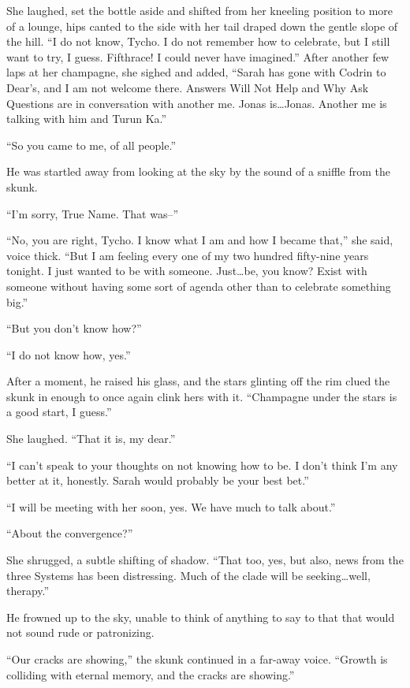 She laughed, set the bottle aside and shifted from her kneeling position to more of a lounge, hips canted to the side with her tail draped down the gentle slope of the hill. ``I do not know, Tycho. I do not remember how to celebrate, but I still want to try, I guess. Fifthrace! I could never have imagined.'' After another few laps at her champagne, she sighed and added, ``Sarah has gone with Codrin to Dear's, and I am not welcome there. Answers Will Not Help and Why Ask Questions are in conversation with another me. Jonas is\ldots Jonas. Another me is talking with him and Turun Ka.''

``So you came to me, of all people.''

He was startled away from looking at the sky by the sound of a sniffle from the skunk.

``I'm sorry, True Name. That was--''

``No, you are right, Tycho. I know what I am and how I became that,'' she said, voice thick. ``But I am feeling every one of my two hundred fifty-nine years tonight. I just wanted to be with someone. Just\ldots be, you know? Exist with someone without having some sort of agenda other than to celebrate something big.''

``But you don't know how?''

``I do not know how, yes.''

After a moment, he raised his glass, and the stars glinting off the rim clued the skunk in enough to once again clink hers with it. ``Champagne under the stars is a good start, I guess.''

She laughed. ``That it is, my dear.''

``I can't speak to your thoughts on not knowing how to be. I don't think I'm any better at it, honestly. Sarah would probably be your best bet.''

``I will be meeting with her soon, yes. We have much to talk about.''

``About the convergence?''

She shrugged, a subtle shifting of shadow. ``That too, yes, but also, news from the three Systems has been distressing. Much of the clade will be seeking\ldots well, therapy.''

He frowned up to the sky, unable to think of anything to say to that that would not sound rude or patronizing.

``Our cracks are showing,'' the skunk continued in a far-away voice. ``Growth is colliding with eternal memory, and the cracks are showing.''

